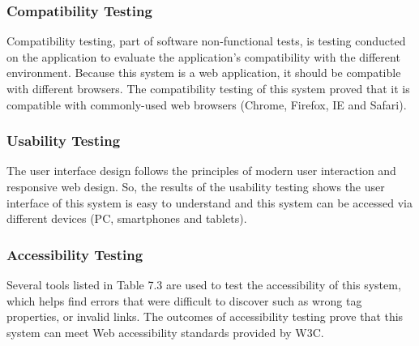 \subsubsection{Compatibility Testing}

Compatibility testing, part of software non-functional tests, is testing conducted on the application to evaluate the application's compatibility with the different environment. Because this system is a web application, it should be compatible with different browsers. The compatibility testing of this system proved that it is compatible with commonly-used web browsers (Chrome, Firefox, IE and Safari).


\subsubsection{Usability Testing}

The user interface design follows the principles of modern user interaction and responsive web design. So, the results of the usability testing shows the user interface of this system is easy to understand and this system can be accessed via different devices (PC, smartphones and tablets).

\subsubsection{Accessibility Testing}

Several tools listed in Table 7.3 are used to test the accessibility of this system, which helps find errors that were difficult to discover such as wrong tag properties, or invalid links. The outcomes of accessibility testing prove that this system can meet Web accessibility standards provided by W3C.


